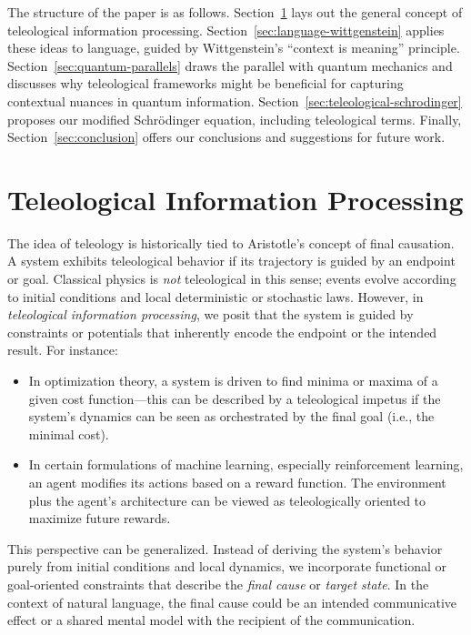 \documentclass[11pt]{article}
\begin{document}
The structure of the paper is as follows. Section~\ref{sec:teleological-info} lays out the general concept of teleological information processing. Section~\ref{sec:language-wittgenstein} applies these ideas to language, guided by Wittgenstein’s ``context is meaning'' principle. Section~\ref{sec:quantum-parallels} draws the parallel with quantum mechanics and discusses why teleological frameworks might be beneficial for capturing contextual nuances in quantum information. Section~\ref{sec:teleological-schrodinger} proposes our modified Schr\"odinger equation, including teleological terms. Finally, Section~\ref{sec:conclusion} offers our conclusions and suggestions for future work.

\section{Teleological Information Processing}
\label{sec:teleological-info}
The idea of teleology is historically tied to Aristotle's concept of final causation. A system exhibits teleological behavior if its trajectory is guided by an endpoint or goal. Classical physics is \emph{not} teleological in this sense; events evolve according to initial conditions and local deterministic or stochastic laws. However, in \emph{teleological information processing}, we posit that the system is guided by constraints or potentials that inherently encode the endpoint or the intended result. For instance:
\begin{itemize}
    \item In optimization theory, a system is driven to find minima or maxima of a given cost function---this can be described by a teleological impetus if the system's dynamics can be seen as orchestrated by the final goal (i.e., the minimal cost).
    \item In certain formulations of machine learning, especially reinforcement learning, an agent modifies its actions based on a reward function. The environment plus the agent's architecture can be viewed as teleologically oriented to maximize future rewards.
\end{itemize}

This perspective can be generalized. Instead of deriving the system's behavior purely from initial conditions and local dynamics, we incorporate functional or goal-oriented constraints that describe the \emph{final cause} or \emph{target state}. In the context of natural language, the final cause could be an intended communicative effect or a shared mental model with the recipient of the communication.
\end{document}
